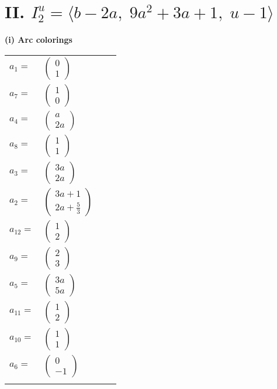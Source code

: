 \documentclass[1p]{elsarticle_modified}
\theoremstyle{definition}
\begin{document}
\centering \section*{II. $I^u_{2}= \langle b-2 a,\;9 a^2+3 a+1,\;u-1 \rangle$}
\flushleft \textbf{(i) Arc colorings}\\
\begin{tabular}{m{7pt} m{180pt} m{7pt} m{180pt} }
\flushright $a_{1}=$&$\begin{pmatrix}0\\1\end{pmatrix}$ \\
\flushright $a_{7}=$&$\begin{pmatrix}1\\0\end{pmatrix}$ \\
\flushright $a_{4}=$&$\begin{pmatrix}a\\2 a\end{pmatrix}$ \\
\flushright $a_{8}=$&$\begin{pmatrix}1\\1\end{pmatrix}$ \\
\flushright $a_{3}=$&$\begin{pmatrix}3 a\\2 a\end{pmatrix}$ \\
\flushright $a_{2}=$&$\begin{pmatrix}3 a+1\\2 a+\frac{5}{3}\end{pmatrix}$ \\
\flushright $a_{12}=$&$\begin{pmatrix}1\\2\end{pmatrix}$ \\
\flushright $a_{9}=$&$\begin{pmatrix}2\\3\end{pmatrix}$ \\
\flushright $a_{5}=$&$\begin{pmatrix}3 a\\5 a\end{pmatrix}$ \\
\flushright $a_{11}=$&$\begin{pmatrix}1\\2\end{pmatrix}$ \\
\flushright $a_{10}=$&$\begin{pmatrix}1\\1\end{pmatrix}$ \\
\flushright $a_{6}=$&$\begin{pmatrix}0\\-1\end{pmatrix}$\\&\end{tabular}
\end{document}
